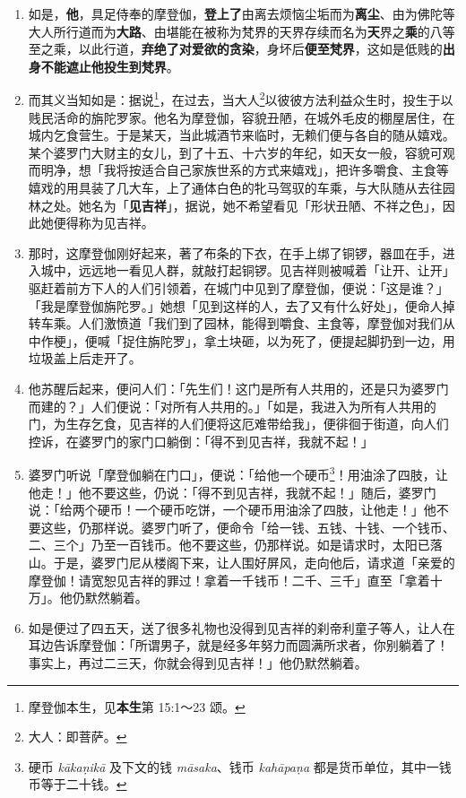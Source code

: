\begin{enumerate}\item 如是，\textbf{他}，具足侍奉的摩登伽，\textbf{登上了}由离去烦恼尘垢而为\textbf{离尘}、由为佛陀等大人所行道而为\textbf{大路}、由堪能在被称为梵界的天界存续而名为\textbf{天}界之\textbf{乘}的八等至之乘，以此行道，\textbf{弃绝了对爱欲的贪染}，身坏后\textbf{便至梵界}，这如是低贱的\textbf{出身不能遮止他投生到梵界}。
\item 而其义当知如是：据说\footnote{摩登伽本生，见\textbf{本生}第 15:1～23 颂。}，在过去，当大人\footnote{大人：即菩萨。}以彼彼方法利益众生时，投生于以贱民活命的旃陀罗家。他名为摩登伽，容貌丑陋，在城外毛皮的棚屋居住，在城内乞食营生。于是某天，当此城酒节来临时，无赖们便与各自的随从嬉戏。某个婆罗门大财主的女儿，到了十五、十六岁的年纪，如天女一般，容貌可观而明净，想「我将按适合自己家族世系的方式来嬉戏」，把许多嚼食、主食等嬉戏的用具装了几大车，上了通体白色的牝马驾驭的车乘，与大队随从去往园林之处。她名为「\textbf{见吉祥}」，据说，她不希望看见「形状丑陋、不祥之色」，因此她便得称为见吉祥。
\item 那时，这摩登伽刚好起来，著了布条的下衣，在手上绑了铜锣，器皿在手，进入城中，远远地一看见人群，就敲打起铜锣。见吉祥则被喊着「让开、让开」驱赶着前方下人的人们引领着，在城门中见到了摩登伽，便说：「这是谁？」「我是摩登伽旃陀罗。」她想「见到这样的人，去了又有什么好处」，便命人掉转车乘。人们激愤道「我们到了园林，能得到嚼食、主食等，摩登伽对我们从中作梗」，便喊「捉住旃陀罗」，拿土块砸，以为死了，便提起脚扔到一边，用垃圾盖上后走开了。
\item 他苏醒后起来，便问人们：「先生们！这门是所有人共用的，还是只为婆罗门而建的？」人们便说：「对所有人共用的。」「如是，我进入为所有人共用的门，为生存乞食，见吉祥的人们便将这厄难带给我」，便徘徊于街道，向人们控诉，在婆罗门的家门口躺倒：「得不到见吉祥，我就不起！」
\item 婆罗门听说「摩登伽躺在门口」，便说：「给他一个硬币\footnote{硬币 \textit{kākaṇikā} 及下文的钱 \textit{māsaka}、钱币 \textit{kahāpaṇa} 都是货币单位，其中一钱币等于二十钱。}！用油涂了四肢，让他走！」他不要这些，仍说：「得不到见吉祥，我就不起！」随后，婆罗门说：「给两个硬币！一个硬币吃饼，一个硬币用油涂了四肢，让他走！」他不要这些，仍那样说。婆罗门听了，便命令「给一钱、五钱、十钱、一个钱币、二、三个」乃至一百钱币。他不要这些，仍那样说。如是请求时，太阳已落山。于是，婆罗门尼从楼阁下来，让人围好屏风，走向他后，请求道「亲爱的摩登伽！请宽恕见吉祥的罪过！拿着一千钱币！二千、三千」直至「拿着十万」。他仍默然躺着。
\item 如是便过了四五天，送了很多礼物也没得到见吉祥的刹帝利童子等人，让人在耳边告诉摩登伽：「所谓男子，就是经多年努力而圆满所求者，你别躺着了！事实上，再过二三天，你就会得到见吉祥！」他仍默然躺着。

\end{enumerate}
